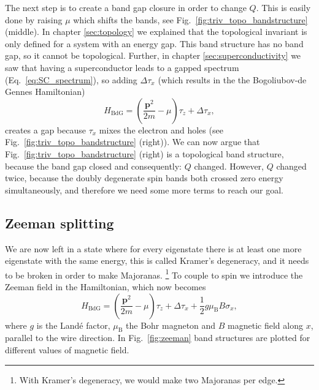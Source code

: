 The next step is to create a band gap closure in order to change $Q$.
This is easily done by raising $\mu$ which shifts the bands, see Fig.~\ref{fig:triv_topo_bandstructure} (middle).
In chapter \ref{sec:topology} we explained that the topological invariant is only defined for a system with an energy gap.
This band structure has no band gap, so it cannot be topological.
Further, in chapter \ref{sec:superconductivity} we saw that having a superconductor leads to a gapped spectrum (Eq.~\ref{eq:SC_spectrum}), so adding $\Delta\tau_{x}$ (which results in the the Bogoliubov-de Gennes Hamiltonian)
\[
H_{\textrm{BdG}}=\left(\frac{\bm{p}^{2}}{2m}-\mu\right)\tau_{z}+\Delta\tau_{x},
\]
creates a gap because $\tau_{x}$ mixes the electron and holes (see Fig.~\ref{fig:triv_topo_bandstructure} (right)).
We can now argue that Fig.~\ref{fig:triv_topo_bandstructure} (right) is a topological band structure, because the band gap closed and consequently: $Q$ changed.
However, $Q$ changed twice, because the doubly degenerate spin bands both crossed zero energy simultaneously, and therefore we need some more terms to reach our goal.

\subsection{Zeeman splitting}

We are now left in a state where for every eigenstate there is at least one more eigenstate with the same energy, this is called Kramer's degeneracy, and it needs to be broken in order to make Majoranas.
\footnote{With Kramer's degeneracy, we would make two Majoranas per edge.}
To couple to spin we introduce the Zeeman field in the Hamiltonian, which now becomes
\begin{equation}
H_{\textrm{BdG}}=\left(\frac{\bm{p}^{2}}{2m}-\mu\right)\tau_{z}+\Delta\tau_{x}+\frac{1}{2}g\mu_{\textrm{B}}B\sigma_{x},\label{eq:zeeman}
\end{equation}
where $g$ is the Landé factor, $\mu_{\textrm{B}}$ the Bohr magneton and $B$ magnetic field along $x$, parallel to the wire direction.
In Fig.~\ref{fig:zeeman} band structures are plotted for different values of magnetic field.

